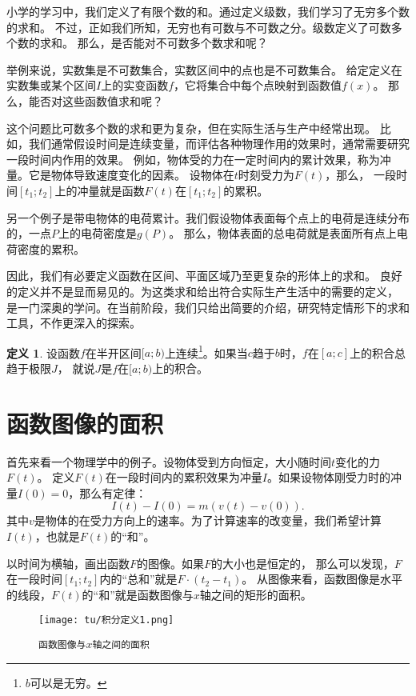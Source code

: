 \documentclass[12pt,UTF8]{ctexbook}
\theoremstyle{definition}
\newtheorem{df}{定义}[section]
\theoremstyle{plain}
\begin{document}
小学的学习中，我们定义了有限个数的和。通过定义级数，我们学习了无穷多个数的求和。
不过，正如我们所知，无穷也有可数与不可数之分。级数定义了可数多个数的求和。
那么，是否能对不可数多个数求和呢？

举例来说，实数集是不可数集合，实数区间中的点也是不可数集合。
给定定义在实数集或某个区间$I$上的实变函数$f$，它将集合中每个点映射到函数值$f(x)$。
那么，能否对这些函数值求和呢？

这个问题比可数多个数的求和更为复杂，但在实际生活与生产中经常出现。
比如，我们通常假设时间是连续变量，而评估各种物理作用的效果时，通常需要研究一段时间内作用的效果。
例如，物体受的力在一定时间内的累计效果，称为冲量。它是物体导致速度变化的因素。
设物体在$t$时刻受力为$F(t)$，那么，
一段时间$[t_1; t_2]$上的冲量就是函数$F(t)$在$[t_1; t_2]$的累积。

另一个例子是带电物体的电荷累计。我们假设物体表面每个点上的电荷是连续分布的，一点$P$上的电荷密度是$g(P)$。
那么，物体表面的总电荷就是表面所有点上电荷密度的累积。

因此，我们有必要定义函数在区间、平面区域乃至更复杂的形体上的求和。
良好的定义并不是显而易见的。为这类求和给出符合实际生产生活中的需要的定义，
是一门深奥的学问。在当前阶段，我们只给出简要的介绍，研究特定情形下的求和工具，不作更深入的探索。

\begin{df}
    设函数$f$在半开区间$[a;b)$上连续\footnote{$b$可以是无穷。}。如果当$c$趋于$b$时，$f$在$[a;c]$上的积合总趋于极限$J$，
    就说$J$是$f$在$[a;b)$上的积合。
\end{df}\section{函数图像的面积}

首先来看一个物理学中的例子。设物体受到方向恒定，大小随时间$t$变化的力$F(t)$。
定义$F(t)$在一段时间内的累积效果为冲量$I$。如果设物体刚受力时的冲量$I(0) = 0$，那么有定律：
$$ I(t) - I(0) = m(v(t) - v(0)).$$
其中$v$是物体的在受力方向上的速率。为了计算速率的改变量，我们希望计算$I(t)$，也就是$F(t)$的“和”。

以时间为横轴，画出函数$F$的图像。如果$F$的大小也是恒定的，
那么可以发现，$F$在一段时间$[t_1; t_2]$内的“总和”就是$F \cdot (t_2 - t_1)$。
从图像来看，函数图像是水平的线段，$F(t)$的“和”就是函数图像与$x$轴之间的矩形的面积。

\begin{figure}[h] %
    \vspace{4pt}
    \centering
    \texttt{[image: tu/积分定义1.png]}
    \caption*{\texttt{函数图像与$x$轴之间的面积}}
\end{figure}
\end{document}
